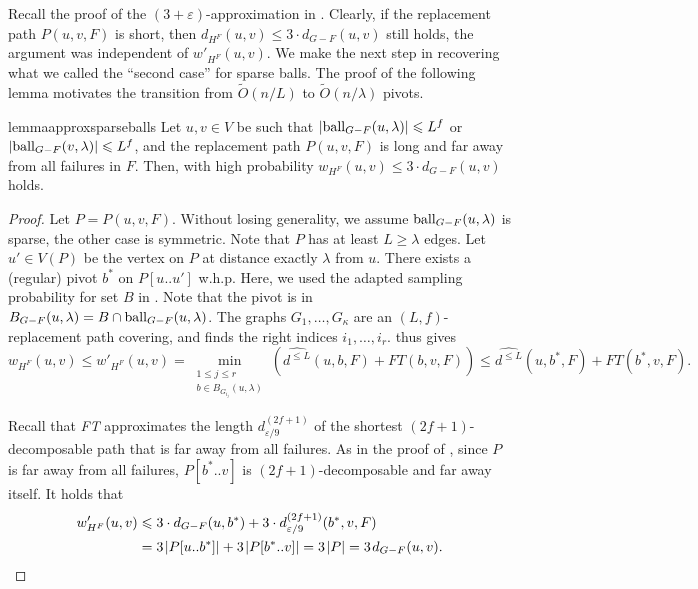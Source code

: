 \documentclass{article}\usepackage[a4paper,margin=20mm]{geometry}
\newcommand*{\Otilde}{\widetilde{O}}
\newcommand*{\length}[1]{|#1|}
\newcommand*{\ball}{\mbox{\rm ball}}
\newcommand*{\nwspace}{\hspace*{.1em}}
\renewcommand{\le}{\leqslant}
\renewcommand{\ge}{\geqslant}
\newcommand{\eps}{\varepsilon}
\begin{document}
Recall the proof of the $(3{+}\varepsilon)$-approximation 
in .
Clearly, if the replacement path $P(u,v,F)$ is short,
then $d_{H^F}(u,v) \le 3 \cdot d_{G-F}(u,v)$ still holds,
the argument was independent of $w'_{H^F}(u,v)$.
We make the next step in recovering what we called the ``second case'' for sparse balls.
The proof of the following lemma motivates the transition from $\Otilde(n/L)$ to $\Otilde(n/\lambda)$ pivots.

\begin{restatable}{lemma}{approxsparseballs}
\label{lem:approx_sparse_balls}
	Let $u,v \in V$ be such that $|\ball_{G-F}(u,\lambda)| \le L^f$
	or $|\ball_{G-F}(v,\lambda)| \le L^f$, and the replacement path $P(u,v,F)$
	is long and far away from all failures in $F$.
	Then, with high probability $w_{H^F}(u,v) \le 3 \cdot d_{G-F}(u,v)$ holds.
\end{restatable}

\begin{proof}
  Let $P = P(u,v,F)$.
  Without losing generality, we assume $\ball_{G-F}(u,\lambda)$ is sparse,
  the other case is symmetric.
  Note that $P$ has at least $L \ge \lambda$ edges.
  Let $u' \in V(P)$ be the vertex on $P$ at distance exactly $\lambda$ from $u$.
  There exists a (regular) pivot $b^*$ on $P[u..u']$ w.h.p.
  Here, we used the adapted sampling probability for set $B$ in .
  Note that the pivot is in $B_{G-F}(u,\lambda) = B \cap \ball_{G-F}(u,\lambda)$.
  The graphs $G_1, \dots, G_\kappa$ are an $(L,f)$-replacement path covering,
  and  finds the right indices $i_1, \dots, i_r$.
   thus gives
  \begin{equation*}
    w_{H^F}(u,v) \le w'_{H^F}(u,v) 
    	 = \min_{
		\substack{
			1\le j \le r \\
			b \in B_{G_{i_j}}(u,\lambda)} 
		}\left(\widehat{d^{\le L}}(u,b,F) + FT(b,v,F)\right)
    	\le \widehat{d^{\le L}}(u,b^*,F) + FT(b^*,v,F).
  \end{equation*}
  
  Recall that \emph{FT} approximates the length $d^{(2f+1)}_{\eps/9}$
  of the shortest $(2f{+}1)$-decomposable path that is far away from all failures.
  As in the proof of , since $P$ is far away from all failures,
  $P[b^*..v]$ is $(2f{+}1)$-decomposable and far away itself.
  It holds that
  \begin{align*}
     w'_{H^F}(u,v) &\le 3 \cdot d_{G-F}(u,b^*)
        + 3 \cdot d^{(2f+1)}_{\eps/9}(b^*,v,F)\\
      &= 3 \nwspace \length{P[u..b^*]}
        + 3 \nwspace \length{P[b^*..v]} = 3 \nwspace |P|
      = 3 \nwspace d_{G-F}(u,v). \qedhere
  \end{align*}  
\end{proof}
\end{document}
